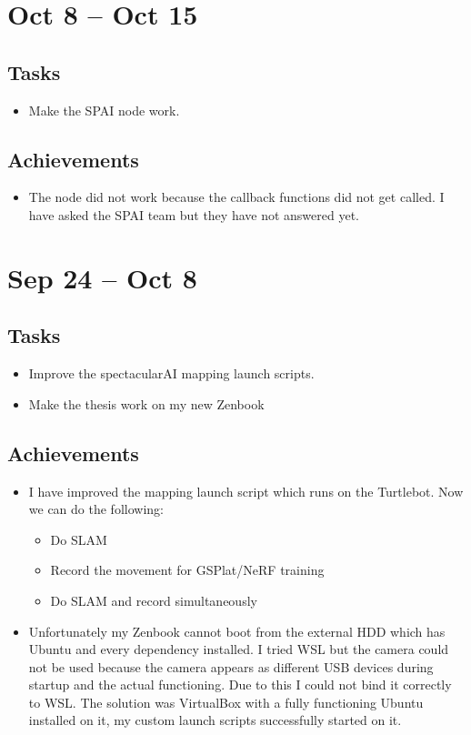 \documentclass{article}
\begin{document}
\newpage

\section{Oct 8 -- Oct 15}
\subsection{Tasks}
\begin{itemize}
    \item Make the SPAI node work. 
\end{itemize}

\subsection{Achievements}
\begin{itemize}
    \item The node did not work because the callback functions did not get called. I have asked the SPAI team but they have not answered yet.
\end{itemize}

\newpage

\section{Sep 24 -- Oct 8}
\subsection{Tasks}
\begin{itemize}
    \item Improve the spectacularAI mapping launch scripts. 
    \item Make the thesis work on my new Zenbook 
\end{itemize}

\subsection{Achievements}
\begin{itemize}
    \item I have improved the mapping launch script which runs on the Turtlebot. Now we can do the following:
    \begin{itemize}
        \item Do SLAM
        \item Record the movement for GSPlat/NeRF training
        \item Do SLAM and record simultaneously
    \end{itemize}
    \item Unfortunately my Zenbook cannot boot from the external HDD which has Ubuntu and every dependency installed. I tried WSL but the camera could not be used because the camera appears as different USB devices during startup and the actual functioning. Due to this I could not bind it correctly to WSL. The solution was VirtualBox with a fully functioning Ubuntu installed on it, my custom launch scripts successfully started on it.
\end{itemize}
\end{document}
